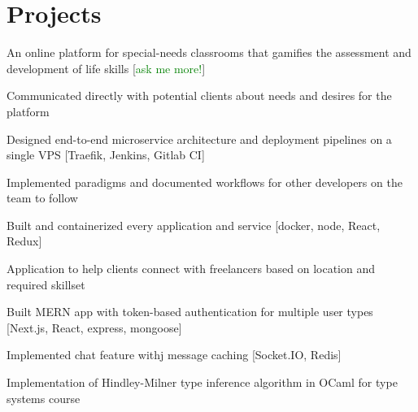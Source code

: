 \documentclass[letterpaper]{deedy-resume} %
\begin{document}
\begin{minipage}[t]{1.0\textwidth}
\sectionspace %


\section{Projects}


An online platform for special-needs classrooms that gamifies the assessment and development of life skills [\textcolor{green}{ask me more!}]
\begin{tightitemize}
\item Communicated directly with potential clients about needs and desires for the platform
\item Designed end-to-end microservice architecture and deployment pipelines on a single VPS [Traefik, Jenkins, Gitlab CI]
\item Implemented paradigms and documented workflows for other developers on the team to follow
\item Built and containerized every application and service [docker, node, React, Redux]
\end{tightitemize}

Application to help clients connect with freelancers based on location and required skillset
\begin{tightitemize}
\item Built MERN app with token-based authentication for multiple user types [Next.js, React, express, mongoose]
\item Implemented chat feature withj message caching [Socket.IO, Redis]
\end{tightitemize}

Implementation of Hindley-Milner type inference algorithm in OCaml for type systems course

\sectionspace %


\end{minipage}
\end{document}
